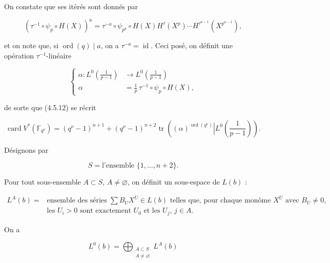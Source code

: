 On constate que ses itérés sont donnés par

\begin{equation}\tag{4.5.14}
(\tau^{-1}\circ\psi_p\circ H(X))^a
=\tau^{-a}\circ\psi_{p^a}\circ
H(X)H^\tau(X^p)\cdots H^{\tau^{a-1}}(X^{p^{a-1}}),
\end{equation}

et on note que, si $\operatorname{ord}(q)\mid a$, on a
$\tau^{-a}=\operatorname{id}$. Ceci posé, on définit une opération
$\tau^{-1}$-linéaire

\begin{equation}\tag{4.5.15}
\left\{
\begin{aligned}
\alpha:L^0\!\left(\frac1{p-1}\right)
&\longrightarrow L^0\!\left(\frac1{p-1}\right)\\
\alpha&=\frac1p\,\tau^{-1}\circ\psi_p\circ H(X),
\end{aligned}
\right.
\end{equation}

de sorte que (4.5.12) se récrit

\begin{equation}\tag{4.5.16}
\operatorname{card}V^*(\mathbb F_{q^\nu})
=(q^\nu-1)^{n+1}
+(q^\nu-1)^{n+2}
\operatorname{tr}\!\left(
\left.(\alpha)^{\operatorname{ord}(q^\nu)}
\right|L^0\!\left(\frac1{p-1}\right)\right).
\end{equation}

Désignons par

\begin{equation}\tag{4.5.17}
S=\text{l'ensemble }\{1,\ldots,n+2\}.
\end{equation}

Pour tout sous-ensemble $A\subset S$, $A\ne\varnothing$, on définit un
sous-espace de $L(b)$ :

\begin{equation}\tag{4.5.18}
\begin{aligned}
L^A(b)={}&\text{ensemble des séries $\sum B_UX^U\in L(b)$ telles que, pour chaque
monôme $X^U$ avec $B_U\ne0$,}\\
&\text{les $U_i>0$ sont exactement $U_0$ et les $U_j$, $j\in A$}.
\end{aligned}
\end{equation}

On a

\begin{equation}\tag{4.5.19}
L^0(b)=\bigoplus_{\substack{A\subset S\\A\ne\varnothing}}L^A(b)
\end{equation}

